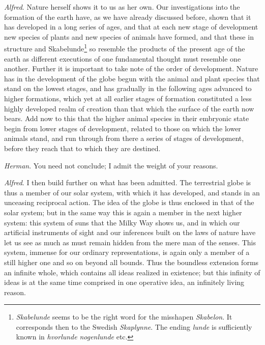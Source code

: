 \documentclass[12pt,a4paper,openany]{book}
\newcommand{\opage}[1]{\marginnote{\footnotesize\textit{[#1]}}}
\begin{document}
\emph{Alfred}. Nature herself shows it to us as her own. Our investigations into the
formation of the earth have, as we have already discussed before, shown that it has
developed in a long series of ages, and that at each new stage of development new
species of plants and new species of animals have formed, and that these in
structure and Skabelunde\footnote[1]{\emph{Skabelunde} seems to be the right word for the misshapen \emph{Skabelon}. It corresponds then to the Swedish \emph{Skaplynne}. The ending \emph{lunde} is sufficiently known in \emph{hvorlunde} \emph{nogenlunde} etc.} so resemble the products of the present
age of the earth as different executions of one fundamental thought must resemble one
another. Further it is important
\setcounter{footnote}{0}%
\opage{67}to take note of the order of development. Nature has in the development of the
globe begun with the animal and plant species that stand on the lowest stages, and
has gradually in the following ages advanced to higher formations, which yet at all
earlier stages of formation constituted a less highly developed realm of creation
than that which the surface of the earth now bears. Add now to this that the higher
animal species in their embryonic state begin from lower stages of development,
related to those on which the lower animals stand, and run through from there a
series of stages of development, before they reach that to which they are destined.


\emph{Herman}. You need not conclude; I admit the weight of your reasons.

\emph{Alfred}. I then build further on what has been admitted. The terrestrial globe
is thus a member of our solar system, with which it has developed, and stands in an
unceasing reciprocal action. The idea of the globe is thus enclosed in that of the
solar system; but in the same way this is again a member in the next higher system:
this system of suns that the Milky Way shows us, and in which our artificial
instruments of sight and our inferences built on the laws of nature have let us see
as much as must remain hidden from the mere man of the senses. This system, immense
for our ordinary representations, is again only a member of a still higher one and
so on beyond all bounds. Thus the boundless extension forms an infinite whole, which
contains all ideas realized in existence; but this infinity of ideas is at the same
time comprised in one operative idea, an infinitely living reason.
\end{document}
